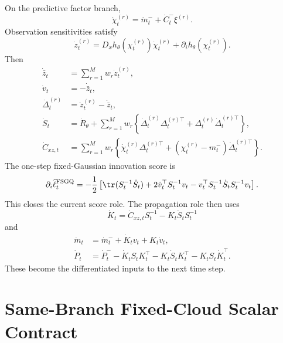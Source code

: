 On the predictive factor branch,
\begin{equation}
  \dot\chi_t^{(r)}=
  \dot m_t^-+\dot C_t^-\xi^{(r)}.
  \label{eq:bf-hd-sgqf-dot-obs-place}
\end{equation}
Observation sensitivities satisfy
\begin{equation}
  \dot z_t^{(r)}=
  D_xh_\theta(\chi_t^{(r)})\dot\chi_t^{(r)}
  +\partial_i h_\theta(\chi_t^{(r)}).
  \label{eq:bf-hd-sgqf-dot-obs-values}
\end{equation}
Then
\begin{align}
  \dot{\bar z}_t&=\sum_{r=1}^M w_r\dot z_t^{(r)},
  \label{eq:bf-hd-sgqf-dot-zbar}\\
  \dot v_t&=-\dot{\bar z}_t,
  \label{eq:bf-hd-sgqf-dot-v}\\
  \dot\Delta_t^{(r)}&=\dot z_t^{(r)}-\dot{\bar z}_t,
  \label{eq:bf-hd-sgqf-dot-Delta}\\
  \dot S_t&=\dot R_\theta+
  \sum_{r=1}^M w_r\left\{\dot\Delta_t^{(r)}\Delta_t^{(r)\top}+
  \Delta_t^{(r)}\dot\Delta_t^{(r)\top}\right\},
  \label{eq:bf-hd-sgqf-dot-S}\\
  \dot C_{xz,t}&=
  \sum_{r=1}^M w_r\left\{\dot\chi_t^{(r)}\Delta_t^{(r)\top}+
  (\chi_t^{(r)}-m_t^-)\dot\Delta_t^{(r)\top}\right\}.
  \label{eq:bf-hd-sgqf-dot-Cxz}
\end{align}
The one-step fixed-Gaussian innovation score is
\begin{equation}
  \partial_i\widehat\ell_t^{\rm FSGQ}
  =
  -\frac12\left[
    \tr(S_t^{-1}\dot S_t)
    +2\dot v_t^\top S_t^{-1}v_t
    -v_t^\top S_t^{-1}\dot S_tS_t^{-1}v_t
  \right].
  \label{eq:bf-hd-sgqf-score}
\end{equation}
This closes the current score role.  The propagation role then uses
\begin{equation}
  \dot K_t=
  \dot C_{xz,t}S_t^{-1}-K_t\dot S_tS_t^{-1}
  \label{eq:bf-hd-sgqf-dot-K}
\end{equation}
and
\begin{align}
  \dot m_t&=\dot m_t^-+\dot K_tv_t+K_t\dot v_t,
  \label{eq:bf-hd-sgqf-dot-m}\\
  \dot P_t&=\dot P_t^- -\dot K_tS_tK_t^\top-K_t\dot S_tK_t^\top-K_tS_t\dot K_t^\top.
  \label{eq:bf-hd-sgqf-dot-P}
\end{align}
These become the differentiated inputs to the next time step.

\section{Same-Branch Fixed-Cloud Scalar Contract}
\label{sec:bf-hd-sgqf-same-branch}


